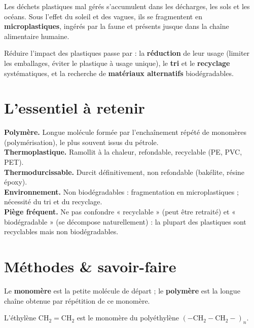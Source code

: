 \begin{propriete}
Les déchets plastiques mal gérés s'accumulent dans les décharges, les sols et les
océans. Sous l'effet du soleil et des vagues, ils se fragmentent en
\textbf{microplastiques}, ingérés par la faune et présents jusque dans la chaîne
alimentaire humaine.
\end{propriete}

\begin{propriete}
Réduire l'impact des plastiques passe par : la \textbf{réduction} de leur usage (limiter
les emballages, éviter le plastique à usage unique), le \textbf{tri} et le
\textbf{recyclage} systématiques, et la recherche de \textbf{matériaux alternatifs}
biodégradables.
\end{propriete}

\section{L'essentiel à retenir}

\begin{synthese}
\textbf{Polymère.} Longue molécule formée par l'enchaînement répété de monomères
(polymérisation), le plus souvent issus du pétrole.\\[4pt]
\textbf{Thermoplastique.} Ramollit à la chaleur, refondable, recyclable (PE, PVC,
PET).\\[4pt]
\textbf{Thermodurcissable.} Durcit définitivement, non refondable (bakélite, résine
époxy).\\[4pt]
\textbf{Environnement.} Non biodégradables : fragmentation en microplastiques ;
nécessité du tri et du recyclage.\\[4pt]
\textbf{Piège fréquent.} Ne pas confondre « recyclable » (peut être retraité) et
« biodégradable » (se décompose naturellement) : la plupart des plastiques sont
recyclables mais non biodégradables.
\end{synthese}

\section{Méthodes \& savoir-faire}

Le \textbf{monomère} est la petite molécule de départ ; le \textbf{polymère} est la
longue chaîne obtenue par répétition de ce monomère.
\begin{exemple}
L'éthylène $\mathrm{CH_2\!=\!CH_2}$ est le monomère du polyéthylène
$\mathrm{(-CH_2-CH_2-)}_n$.
\end{exemple}


